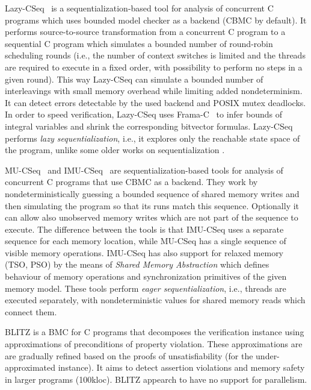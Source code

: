 Lazy-CSeq~ is a se\-quen\-tial\-iza\-tion-based
tool for analysis of concurrent C programs which uses bounded model checker as
a backend (CBMC by default).
It performs source-to-source transformation from a concurrent C program to a
sequential C program which simulates a bounded number of round-robin scheduling
rounds (i.e., the number of context switches is limited and the threads are
required to execute in a fixed order, with possibility to perform no steps in a
given round).
This way Lazy-CSeq can simulate a bounded number of interleavings with small
memory overhead while limiting added nondeterminism.
It can detect errors detectable by the used backend and POSIX mutex deadlocks.
In order to speed verification, Lazy-CSeq uses Frama-C~ to
infer  bounds of integral variables and shrink the corresponding bitvector
formulas.
Lazy-CSeq performs \emph{lazy sequentialization}, i.e., it explores only the reachable state space of the program, unlike some older works on sequentialization .


MU-CSeq~ and IMU-CSeq~
are se\-quen\-tial\-iza\-tion-based tools for analysis of concurrent C programs
that use CBMC as a backend.
They work by nondeterministically guessing a bounded sequence of shared memory
writes and then simulating the program so that its runs match this sequence.
Optionally it can allow also unobserved memory writes which are not part of the
sequence to execute.
The difference between the tools is that IMU-CSeq uses a separate sequence for
each memory location, while MU-CSeq has a single sequence of visible memory
operations.
IMU-CSeq has also support for relaxed memory (TSO, PSO) by the means of
\emph{Shared Memory Abstraction} which defines behaviour of memory operations
and synchronization primitives of the given memory model.
These tools perform \emph{eager sequentialization}, i.e., threads are executed separately, with nondeterministic values for shared memory reads which connect them.


BLITZ  is a BMC for C programs that decomposes the verification instance using approximations of preconditions of property violation.
These approximations are are gradually refined based on the proofs of unsatisfiability (for the under-approximated instance).
It aims to detect assertion violations and memory safety in larger programs (100kloc).
BLITZ appearch to have no support for parallelism.



